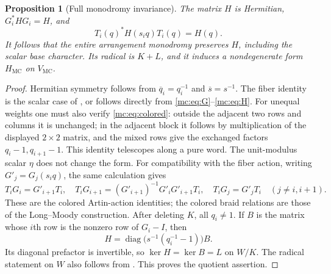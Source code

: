 \documentclass[11pt,a4paper]{article}
\newtheorem{proposition}[theorem]{Proposition}
\theoremstyle{remark}\newtheorem{remark}[theorem]{Remark}
\newcommand{\MC}{\operatorname{MC}}
\begin{document}
\begin{proposition}[Full monodromy invariance]\label{mc:prop:invariance}
The matrix $H$ is Hermitian, $G_i^*HG_i=H$, and
\begin{equation}\label{mc:eq:colored}
 T_i(q)^*H(s_iq)T_i(q)=H(q).
\end{equation}
It follows that the entire arrangement monodromy preserves $H$, including
the scalar base character. Its radical is $K+L$, and it induces a
nondegenerate form $H_{\MC}$ on $V_{\MC}$.
\end{proposition}
\begin{proof}
Hermitian symmetry follows from $\overline q_i=q_i^{-1}$ and
$\overline s=s^{-1}$. The fiber identity is the scalar case of
\cite[Theorem 8]{NegamiKZ}, or follows directly from
\eqref{mc:eq:G}--\eqref{mc:eq:H}. For unequal weights one must also verify
\eqref{mc:eq:colored}: outside the adjacent two rows and columns it is
unchanged; in the adjacent block it follows by multiplication of the
displayed $2\times2$ matrix, and the mixed rows give the exchanged
factors $q_i-1,q_{i+1}-1$. This identity telescopes along a pure word.
The unit-modulus scalar $\eta$ does not change the form.
For compatibility with the fiber action, writing $G'_j=G_j(s_iq)$,
the same calculation gives
\[
 T_iG_i=G'_{i+1}T_i,\quad
 T_iG_{i+1}=(G'_{i+1})^{-1}G'_iG'_{i+1}T_i,\quad
 T_iG_j=G'_jT_i\quad(j\ne i,i+1).
\]
These are the colored Artin-action identities; the colored braid
relations are those of the Long--Moody construction.
After deleting $K$, all $q_i\ne1$. If $B$ is the matrix whose $i$th
row is the nonzero row of $G_i-I$, then
\[
 H=\operatorname{diag}\bigl(s^{-1}(q_i^{-1}-1)\bigr)B.
\]
Its diagonal prefactor is invertible, so $\ker H=\ker B=L$ on $W/K$.
The radical statement on $W$ also follows from
\cite[Theorem 9]{NegamiKZ}. This proves the quotient assertion.
\end{proof}
\end{document}
